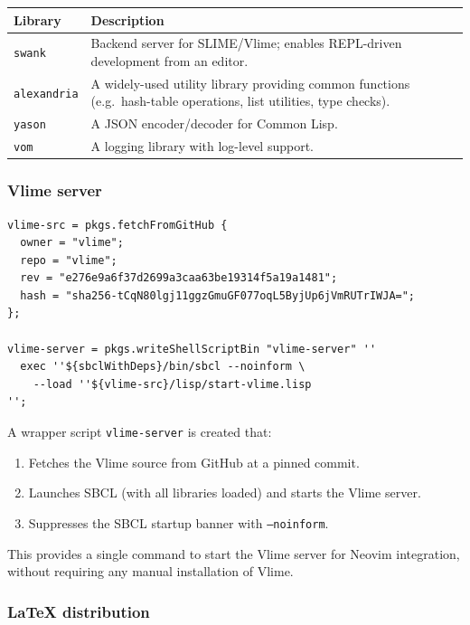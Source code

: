 \documentclass[a4paper,11pt]{article}
\newcommand{\pkg}[1]{\texttt{#1}}
\begin{document}
\begin{center}
\begin{tabular}{lp{9cm}}
  \toprule
  \textbf{Library} & \textbf{Description} \\
  \midrule
  \pkg{swank}      & Backend server for SLIME/Vlime;
                     enables REPL-driven development from an editor. \\
  \pkg{alexandria}  & A widely-used utility library providing common functions
                     (e.g.\ hash-table operations, list utilities, type checks). \\
  \pkg{yason}      & A JSON encoder/decoder for Common Lisp. \\
  \pkg{vom}        & A logging library with log-level support. \\
  \bottomrule
\end{tabular}
\end{center}

\subsubsection{Vlime server}

\begin{lstlisting}[style=nix]
vlime-src = pkgs.fetchFromGitHub {
  owner = "vlime";
  repo = "vlime";
  rev = "e276e9a6f37d2699a3caa63be19314f5a19a1481";
  hash = "sha256-tCqN80lgj11ggzGmuGF077oqL5ByjUp6jVmRUTrIWJA=";
};

vlime-server = pkgs.writeShellScriptBin "vlime-server" ''
  exec ''${sbclWithDeps}/bin/sbcl --noinform \
    --load ''${vlime-src}/lisp/start-vlime.lisp
'';
\end{lstlisting}

A wrapper script \pkg{vlime-server} is created that:

\begin{enumerate}
  \item Fetches the Vlime source from GitHub at a pinned commit.
  \item Launches SBCL (with all libraries loaded) and starts the Vlime server.
  \item Suppresses the SBCL startup banner with \texttt{--noinform}.
\end{enumerate}

This provides a single command to start the Vlime server for Neovim integration,
without requiring any manual installation of Vlime.

\subsubsection{\LaTeX{} distribution}
\end{document}
